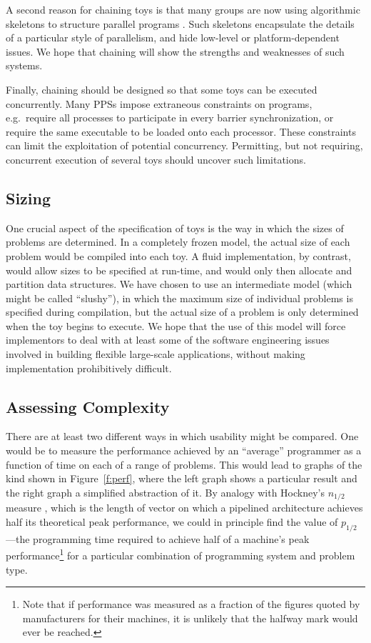 A second reason for chaining toys is that
many groups are now using algorithmic skeletons to structure parallel programs
\cite{b:cole-skel,b:p3l-overview,b:enterprise}.
Such skeletons encapsulate the details of a particular style of parallelism,
and hide low-level or platform-dependent issues.
We hope that chaining will show the strengths and weaknesses of such systems.

Finally,
chaining should be designed so that some toys can be executed concurrently.
Many PPSs impose extraneous constraints on programs,
e.g.\ require all processes to participate in every barrier synchronization,
or require the same executable to be loaded onto each processor.
These constraints can limit the exploitation of potential concurrency.
Permitting, but not requiring, concurrent execution of several toys should uncover such limitations.

\subsection{Sizing\label{s:method-size}}

One crucial aspect of the specification of toys is
the way in which the sizes of problems are determined.
In a completely frozen model, the actual size of each problem would be compiled into each toy.
A fluid implementation, by contrast, would allow sizes to be specified at run-time,
and would only then allocate and partition data structures.
We have chosen to use an intermediate model (which might be called ``slushy''),
in which the maximum size of individual problems is specified during compilation,
but the actual size of a problem is only determined when the toy begins to execute.
We hope that the use of this model will force implementors to deal with
at least some of the software engineering issues
involved in building flexible large-scale applications,
without making implementation prohibitively difficult.

\subsection{Assessing Complexity\label{s:method-complex}}

There are at least two different ways in which usability might be compared.
One would be to measure the performance achieved by an ``average'' programmer
as a function of time on each of a range of problems.
This would lead to graphs of the kind shown in Figure~\ref{f:perf},
where the left graph shows a particular result
and the right graph a simplified abstraction of it.
By analogy with Hockney's $n_{1/2}$ measure \cite{b:hockney-perfparam},
which is the length of vector on which a pipelined architecture achieves
half its theoretical peak performance,
we could in principle find the value of $p_{1/2}$---the programming time required to achieve
half of a machine's peak performance\footnote{Note that
	if performance was measured as a fraction of the figures quoted by manufacturers for their machines,
	it is unlikely that the halfway mark would ever be reached.}
for a particular combination of programming system and problem type.

